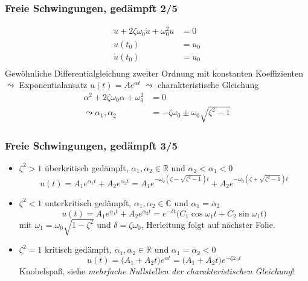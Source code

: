 \begin{frame}
\frametitle{Freie Schwingungen, {\normalsize gedämpft 2/5}}
\begin{align*}
\ddot{u}+2 \zeta\omega_0\dot{u}+\omega_0^2 u&=0\\
u(t_0)&=u_0\\
\dot{u}(t_0)&=\dot{u}_0\\
\end{align*}
Gewöhnliche Differentialgleichung zweiter Ordnung mit konstanten Koeffizienten $\leadsto$ Exponentialansatz $u(t)=Ae^{\alpha t}$ $\leadsto$ charakteristische Gleichung
\begin{align*}
\alpha^2 + 2 \zeta\omega_0\alpha + \omega_0^2 &= 0 \\
\leadsto \alpha_{1}, \alpha_{2}&=- \zeta\omega_0\pm \omega_0\sqrt{ \zeta^2-1}
\end{align*}
\end{frame}


\begin{frame}
\frametitle{Freie Schwingungen, {\normalsize gedämpft 3/5}}
\begin{itemize}[<+->]

\item $\zeta^2>1$ überkritisch gedämpft, $\alpha_1, \alpha_2 \in \mathbb{R}$ und $\alpha_2 < \alpha_1 < 0$  
 \begin{equation*}
 u(t)=A_1 e^{\alpha_1 t}+ A_2 e^{\alpha_2 t}
 =A_1 e^{-\omega_0\left(\zeta-\sqrt{\zeta^2-1}\right)t}
 +A_2 e^{-\omega_0\left(\zeta+\sqrt{\zeta^2-1}\right)t}
 \end{equation*}
 
 \item $\zeta^2<1$ unterkritisch gedämpft, $\alpha_1, \alpha_2 \in \mathbb{C}$ und $\alpha_1=\bar{\alpha}_2$  
 \begin{equation*}
 u(t)= A_1 e^{\alpha_1 t}+ A_2 e^{\alpha_2 t}
 =e^{-\delta t}\bigl( C_1\cos\omega_1 t + C_2\sin\omega_1 t \bigr)
 \end{equation*}
 mit $\omega_1=\omega_0\sqrt{1- \zeta^2}$ und $\delta=\zeta\omega_0$, Herleitung folgt auf nächster Folie.
 
 \item $\zeta^2=1$ kritisch gedämpft,  $\alpha_1, \alpha_2 \in \mathbb{R}$ und $\alpha_1=\alpha_2<0$  
 \begin{equation*}
 u(t)= \bigl( A_1+A_2 t \bigr)e^{\alpha t}
 = \bigl( A_1+A_2 t \bigr)e^{-\zeta\omega_0 t}
 \end{equation*}
 Knobelspaß, siehe \textsl{mehrfache Nullstellen der charakteristischen Gleichung}!
\end{itemize}

\end{frame}

